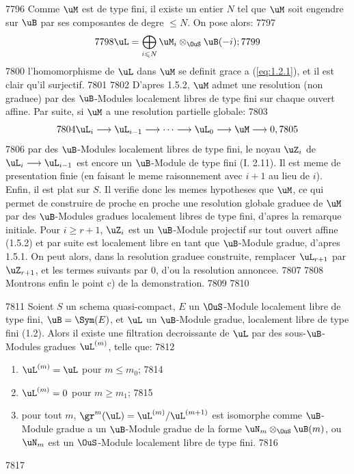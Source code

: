   7796	Comme $\uM$ est de type fini, il existe un entier $N$ tel que $\uM$ soit engendre sur $\uB$ par ses composantes de degre $\leqslant N$. On pose alors:
  7797	\[
  7798	\uL = \bigoplus_{i \leqslant N} \uM_i \otimes_{\OuS} \uB(-i);
  7799	\]
  7800	l'homomorphisme de $\uL$ dans $\uM$ se definit grace a (\ref{eq:1.2.1}), et il est clair qu'il surjectif.
  7801	
  7802	D'apres 1.5.2, $\uM$ admet une resolution (non graduee) par des $\uB$-Modules localement libres de type fini sur chaque ouvert affine. Par suite, si $\uM$ a une resolution partielle globale:
  7803	\[
  7804	\uL_i \longrightarrow \uL_{i-1} \longrightarrow \cdots \longrightarrow \uL_0 \longrightarrow \uM \longrightarrow 0,
  7805	\]
  7806	par des $\uB$-Modules localement libres de type fini, le noyau $\uZ_i$ de $\uL_i \longrightarrow \uL_{i-1}$ est encore un $\uB$-Module de type fini (I. 2.11). Il est meme de presentation finie (en faisant le meme raisonnement avec $i+1$ au lieu de $i$). Enfin, il est plat sur $S$. Il verifie donc les memes hypotheses que $\uM$, ce qui permet de construire de proche en proche une resolution globale graduee de $\uM$ par des $\uB$-Modules gradues localement libres de type fini, d'apres la remarque initiale. Pour $i \geqslant r+1$, $\uZ_i$ est un $\uB$-Module projectif sur tout ouvert affine (1.5.2) et par suite est localement libre en tant que $\uB$-Module gradue, d'apres 1.5.1. On peut alors, dans la resolution graduee construite, remplacer $\uL_{r+1}$ par $\uZ_{r+1}$, et les termes suivants par $0$, d'ou la resolution annoncee.
  7807	
  7808	Montrons enfin le point c) de la demonstration.
  7809	
  7810	\begin{prop}
  7811	Soient $S$ un schema quasi-compact, $E$ un $\OuS$-Module localement libre de type fini, $\uB = \Sym(E)$, et $\uL$ un $\uB$-Module gradue, localement libre de type fini (1.2). Alors il existe une filtration decroissante de $\uL$ par des sous-$\uB$-Modules gradues $\uL^{(m)}$, telle que:
  7812	\begin{enumerate}[label=\roman*)]
  7813	\item $\uL^{(m)} = \uL$ pour $m \leqslant m_0$;
  7814	\item $\uL^{(m)} = 0$ pour $m \geqslant m_1$;
  7815	\item pour tout $m$, $\gr^m(\uL) = \uL^{(m)}/\uL^{(m+1)}$ est isomorphe comme $\uB$-Module gradue a un $\uB$-Module gradue de la forme $\uN_m \otimes_{\OuS} \uB(m)$, ou $\uN_m$ est un $\OuS$-Module localement libre de type fini.
  7816	\end{enumerate}
  7817	\end{prop}
